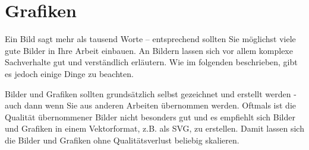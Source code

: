 \section{Grafiken}\label{sec:graphics}
%
\glqq Ein Bild sagt mehr als tausend Worte\grqq{} -- entsprechend sollten Sie möglichst viele gute Bilder in Ihre Arbeit einbauen. An Bildern lassen sich vor allem komplexe Sachverhalte gut und verständlich erläutern. Wie im folgenden beschrieben, gibt es jedoch einige Dinge zu beachten.

Bilder und Grafiken sollten grundsätzlich selbst gezeichnet und erstellt werden - auch dann wenn Sie aus anderen Arbeiten übernommen werden. Oftmals ist die Qualität übernommener Bilder nicht besonders gut und es empfiehlt sich Bilder und Grafiken in einem Vektorformat, z.B. als SVG, zu erstellen. Damit lassen sich die Bilder und Grafiken ohne Qualitätsverlust beliebig skalieren.
